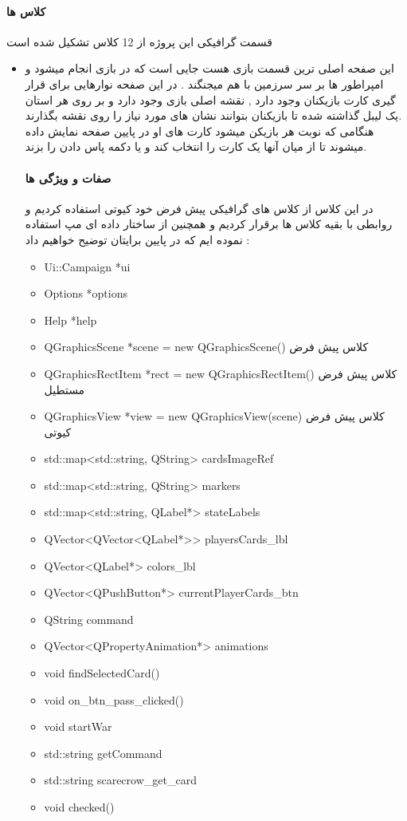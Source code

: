 \documentclass[pdf,titlepage,a4paper]{report}
\begin{document}
	\paragraph{کلاس ها}
	قسمت گرافیکی این پروژه از 12 کلاس تشکیل شده است \\
	\begin{itemize}
		\item {}  این صفحه اصلی ترین قسمت بازی هست جایی است که در بازی انجام میشود و امپراطور ها بر سر سرزمین با هم میجنگند . در این صفحه نوارهایی برای قرار گیری کارت بازیکنان وجود دارد , نقشه اصلی بازی وجود دارد و بر روی هر استان یک لیبل گذاشته شده تا بازیکنان بتوانند نشان های مورد نیاز را روی نقشه بگذارند.\\ هنگامی که نوبت هر بازیکن میشود کارت های او در پایین صفحه نمایش داده میشوند تا از میان آنها یک کارت را انتخاب کند و یا دکمه پاس دادن را بزند.\\
		\paragraph{صفات و ویژگی ها} 
         در این کلاس از کلاس های گرافیکی پیش فرض خود کیوتی استفاده کردیم و روابطی با بقیه کلاس ها برقرار کردیم و همچنین از ساختار داده ای مپ استفاده نموده ایم که در پایین برایتان توضیح خواهیم داد :
		\begin{latin}
			\begin{itemize}
				\item Ui::Campaign *ui
				\item Options *options
				\item Help *help
				\item QGraphicsScene *scene = new QGraphicsScene()  کلاس پیش فرض
				\item QGraphicsRectItem *rect = new QGraphicsRectItem()  کلاس پیش فرض مستطیل
				\item QGraphicsView *view = new QGraphicsView(scene) کلاس پیش فرض کیوتی  
				\item std::map<std::string, QString> cardsImageRef 
				\item std::map<std::string, QString> markers
				\item std::map<std::string, QLabel*> stateLabels
				\item QVector<QVector<QLabel*>> playersCards_lbl
				\item QVector<QLabel*> colors_lbl
				\item QVector<QPushButton*> currentPlayerCards_btn
				\item QString command
				\item QVector<QPropertyAnimation*> animations
				\item void findSelectedCard()
				\item void on_btn_pass_clicked()
				\item void startWar
				\item std::string getCommand
                \item std::string scarecrow_get_card
				\item void checked()


\end{itemize}
\end{latin}
\end{itemize}
\end{document}
